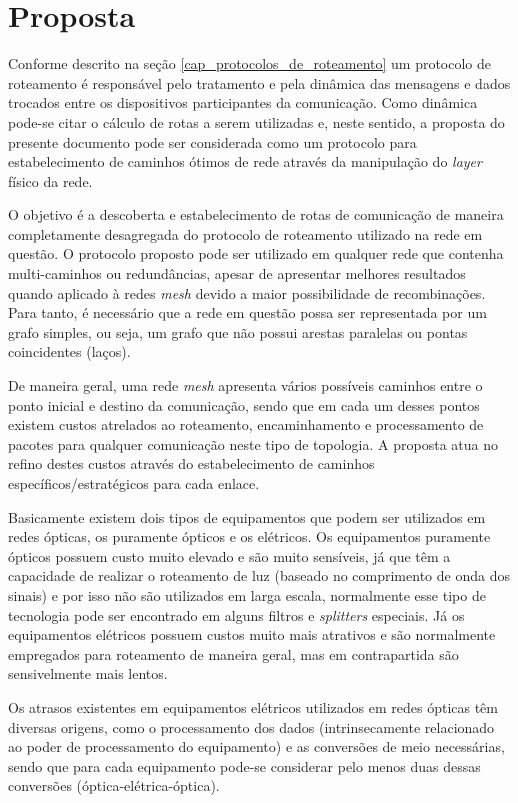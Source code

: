\chapter{Proposta}
Conforme descrito na seção \ref{cap_protocolos_de_roteamento} um protocolo de roteamento é responsável pelo tratamento e pela dinâmica das mensagens e dados trocados entre os dispositivos participantes da comunicação. Como dinâmica pode-se citar o cálculo de rotas a serem utilizadas e, neste sentido, a proposta do presente documento pode ser considerada como um protocolo para estabelecimento de caminhos ótimos de rede através da manipulação do \emph{layer} físico da rede.

O objetivo é a descoberta e estabelecimento de rotas de comunicação de maneira completamente desagregada do protocolo de roteamento utilizado na rede em questão. O protocolo proposto pode ser utilizado em qualquer rede que contenha multi-caminhos ou redundâncias, apesar de apresentar melhores resultados quando aplicado à redes \emph{mesh} devido a maior possibilidade de recombinações. Para tanto, é necessário que a rede em questão possa ser representada por um grafo simples, ou seja, um grafo que não possui arestas paralelas ou pontas coincidentes (laços).

De maneira geral, uma rede \emph{mesh} apresenta vários possíveis caminhos entre o ponto inicial e destino da comunicação, sendo que em cada um desses pontos existem custos atrelados ao roteamento, encaminhamento e processamento de pacotes para qualquer comunicação neste tipo de topologia. A proposta atua no refino destes custos através do estabelecimento de caminhos específicos/estratégicos para cada enlace.

Basicamente existem dois tipos de equipamentos que podem ser utilizados em redes ópticas, os puramente ópticos e os elétricos. Os equipamentos puramente ópticos possuem custo muito elevado e são muito sensíveis, já que têm a capacidade de realizar o roteamento de luz (baseado no comprimento de onda dos sinais) e por isso não são utilizados em larga escala, normalmente esse tipo de tecnologia pode ser encontrado em alguns filtros e \emph{splitters} especiais. Já os equipamentos elétricos possuem custos muito mais atrativos e são normalmente empregados para roteamento de maneira geral, mas em contrapartida são sensivelmente mais lentos.

Os atrasos existentes em equipamentos elétricos utilizados em redes ópticas têm diversas origens, como o processamento dos dados (intrinsecamente relacionado ao poder de processamento do equipamento) e as conversões de meio necessárias, sendo que para cada equipamento pode-se considerar pelo menos duas dessas conversões (óptica-elétrica-óptica). 

